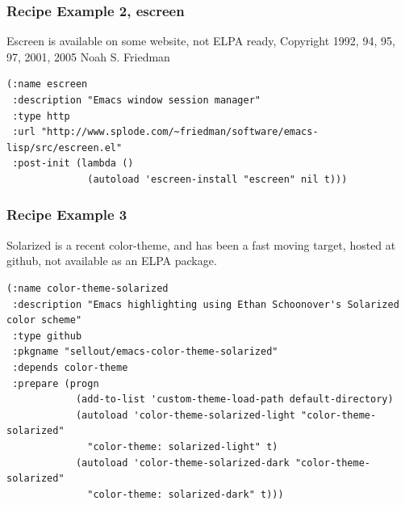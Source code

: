 \documentclass{beamer}
\begin{document}
\begin{frame}[fragile]
  \frametitle{Recipe Example 2, escreen}

  Escreen is available on some website, not ELPA ready, Copyright 1992, 94,
  95, 97, 2001, 2005 Noah S. Friedman \vfill

  \begin{verbatim}
(:name escreen
 :description "Emacs window session manager"
 :type http
 :url "http://www.splode.com/~friedman/software/emacs-lisp/src/escreen.el"
 :post-init (lambda ()
              (autoload 'escreen-install "escreen" nil t)))
  \end{verbatim}
\end{frame}

\begin{frame}[fragile]
  \frametitle{Recipe Example 3}

  Solarized is a recent color-theme, and has been a fast moving target,
  hosted at github, not available as an ELPA package. \vfill

  \begin{verbatim}
(:name color-theme-solarized
 :description "Emacs highlighting using Ethan Schoonover's Solarized color scheme"
 :type github
 :pkgname "sellout/emacs-color-theme-solarized"
 :depends color-theme
 :prepare (progn
            (add-to-list 'custom-theme-load-path default-directory)
            (autoload 'color-theme-solarized-light "color-theme-solarized"
              "color-theme: solarized-light" t)
            (autoload 'color-theme-solarized-dark "color-theme-solarized"
              "color-theme: solarized-dark" t)))
  \end{verbatim}
\end{frame}


\end{document}
